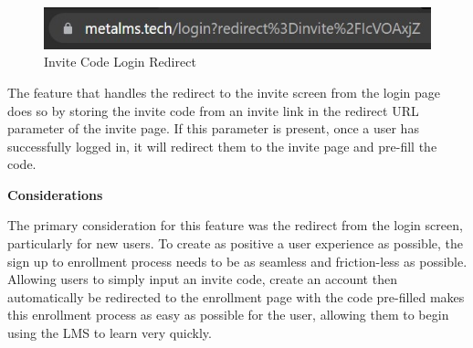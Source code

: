 \begin{figure}[h!]
    \centering
    \includegraphics[scale=0.6]{images/accounts-login-redirect.jpg}
    \caption{Invite Code Login Redirect}
\end{figure}

The feature that handles the redirect to the invite screen from the login page does so by storing the invite code from an invite link in the redirect URL parameter of the invite page. If this parameter is present, once a user has successfully logged in, it will redirect them to the invite page and pre-fill the code.

\textbf{Considerations}

The primary consideration for this feature was the redirect from the login screen, particularly for new users. To create as positive a user experience as possible, the sign up to enrollment process needs to be as seamless and friction-less as possible. Allowing users to simply input an invite code, create an account then automatically be redirected to the enrollment page with the code pre-filled makes this enrollment process as easy as possible for the user, allowing them to begin using the LMS to learn very quickly.